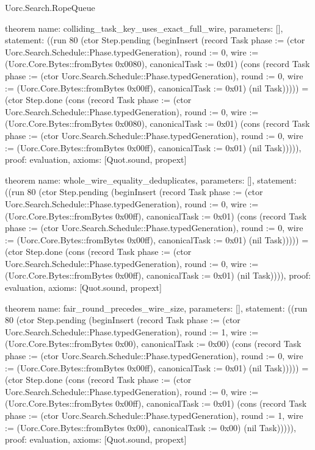 \begin{lexlean}{Uorc.Search.RopeQueue}
\begin{semanticmodule}
theorem{
  name: colliding_task_key_uses_exact_full_wire,
  parameters: [],
  statement: ((run 80 (ctor Step.pending (beginInsert (record Task {phase := (ctor Uorc.Search.Schedule::Phase.typedGeneration), round := 0, wire := (Uorc.Core.Bytes::fromBytes 0x0080), canonicalTask := 0x01}) (cons (record Task {phase := (ctor Uorc.Search.Schedule::Phase.typedGeneration), round := 0, wire := (Uorc.Core.Bytes::fromBytes 0x00ff), canonicalTask := 0x01}) (nil Task))))) = (ctor Step.done (cons (record Task {phase := (ctor Uorc.Search.Schedule::Phase.typedGeneration), round := 0, wire := (Uorc.Core.Bytes::fromBytes 0x0080), canonicalTask := 0x01}) (cons (record Task {phase := (ctor Uorc.Search.Schedule::Phase.typedGeneration), round := 0, wire := (Uorc.Core.Bytes::fromBytes 0x00ff), canonicalTask := 0x01}) (nil Task))))),
  proof: evaluation{},
  axioms: [Quot.sound, propext]
}

theorem{
  name: whole_wire_equality_deduplicates,
  parameters: [],
  statement: ((run 80 (ctor Step.pending (beginInsert (record Task {phase := (ctor Uorc.Search.Schedule::Phase.typedGeneration), round := 0, wire := (Uorc.Core.Bytes::fromBytes 0x00ff), canonicalTask := 0x01}) (cons (record Task {phase := (ctor Uorc.Search.Schedule::Phase.typedGeneration), round := 0, wire := (Uorc.Core.Bytes::fromBytes 0x00ff), canonicalTask := 0x01}) (nil Task))))) = (ctor Step.done (cons (record Task {phase := (ctor Uorc.Search.Schedule::Phase.typedGeneration), round := 0, wire := (Uorc.Core.Bytes::fromBytes 0x00ff), canonicalTask := 0x01}) (nil Task)))),
  proof: evaluation{},
  axioms: [Quot.sound, propext]
}

theorem{
  name: fair_round_precedes_wire_size,
  parameters: [],
  statement: ((run 80 (ctor Step.pending (beginInsert (record Task {phase := (ctor Uorc.Search.Schedule::Phase.typedGeneration), round := 1, wire := (Uorc.Core.Bytes::fromBytes 0x00), canonicalTask := 0x00}) (cons (record Task {phase := (ctor Uorc.Search.Schedule::Phase.typedGeneration), round := 0, wire := (Uorc.Core.Bytes::fromBytes 0x00ff), canonicalTask := 0x01}) (nil Task))))) = (ctor Step.done (cons (record Task {phase := (ctor Uorc.Search.Schedule::Phase.typedGeneration), round := 0, wire := (Uorc.Core.Bytes::fromBytes 0x00ff), canonicalTask := 0x01}) (cons (record Task {phase := (ctor Uorc.Search.Schedule::Phase.typedGeneration), round := 1, wire := (Uorc.Core.Bytes::fromBytes 0x00), canonicalTask := 0x00}) (nil Task))))),
  proof: evaluation{},
  axioms: [Quot.sound, propext]
}
\end{semanticmodule}
\end{lexlean}
